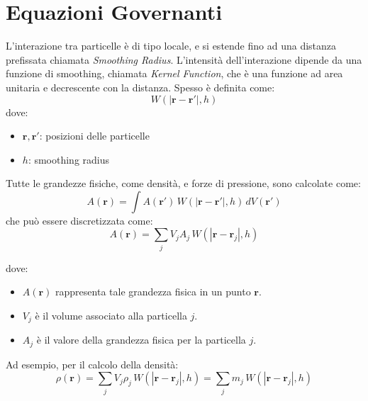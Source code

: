 \section{Equazioni Governanti}
    L'interazione tra particelle è di tipo locale, e si estende fino ad una distanza
    prefissata chiamata \textit{Smoothing Radius}. L'intensità dell'interazione
    dipende da una funzione di smoothing, chiamata \textit{Kernel Function}, che
   è una funzione ad area unitaria e decrescente con la distanza. Spesso è
    definita come:
    \[W(|\mathbf{r} - \mathbf{r'}|, h)\]
    dove:
    \begin{itemize}
        \item $\mathbf{r}, \mathbf{r'}$: posizioni delle particelle
        \item $h$: smoothing radius
    \end{itemize}
    Tutte le grandezze fisiche, come densità, e forze di pressione, sono calcolate
    come: 
    \[
    A(\mathbf{r}) = \int A(\mathbf{r}') \, W\left(| \mathbf{r} - \mathbf{r}' |, h\right) \, dV(\mathbf{r}')
    \]
    che può essere discretizzata come:
    \[
    A(\mathbf{r}) = \sum_{j} V_j A_j \, W\left(| \mathbf{r} - \mathbf{r}_j |, h\right)
    \]

    dove:
    \begin{itemize}
        \item $A(\mathbf{r})$ rappresenta tale grandezza fisica in un punto $\mathbf{r}$.
        \item $V_j$ è il volume associato alla particella $j$.
        \item $A_j$ è il valore della grandezza fisica per la particella $j$.
    \end{itemize}  
    
    \newpage

    Ad esempio, per il calcolo della densità:
    \[\rho(\mathbf{r}) = \sum_{j} V_j \rho_j \, W\left(| \mathbf{r} - \mathbf{r}_j |, h\right) = \sum_{j} m_j \, W\left(| \mathbf{r} - \mathbf{r}_j |, h\right)\] 
